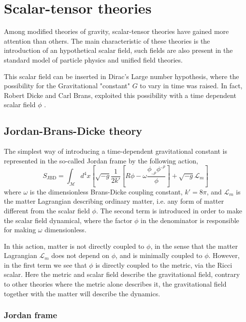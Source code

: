  \chapter{Scalar-tensor theories}

Among modified theories of gravity, scalar-tensor theories have gained more attention than others. 
The main characteristic of these theories is the introduction of an hypothetical scalar field, such fields are also present in the standard model of particle physics and unified field theories.

This scalar field can be inserted in Dirac's Large number hypothesis, where the possibility for the Gravitational "constant" $G$ to vary in time was raised.
In fact, Robert Dicke and Carl Brans, exploited this possibility with a time dependent scalar field $\phi$ \cite{Brans_1961}.

\section{Jordan-Brans-Dicke theory}

The simplest way of introducing a time-dependent gravitational constant is represented in the so-called Jordan frame by the following action,
\begin{equation}
    S_{\text{JBD}}=\int_{\mathcal{M}} d^4x\left[ \sqrt{-g}\frac{1}{2k'}\left[R\phi-\omega \frac{\phi_{,\rho}\phi^{,\rho}}{\phi}\right]+\sqrt{-g}\mathcal{L}_m\right]
    \label{eqn:BD_action_JF}
\end{equation}
where $\omega$ is the dimensionless Brans-Dicke coupling constant, $k'=8\pi$, and $\mathcal{L}_m$ is the matter Lagrangian describing ordinary matter, i.e. any form of matter different from the scalar field $\phi$. The second term is introduced in order to make the scalar field dynamical, where the factor $\phi$ in the denominator is responsible for making $\omega$ dimensionless.

In this action, matter is not directly coupled to $\phi$, in the sense that the matter Lagrangian $\mathcal{L}_m$ does not depend on $\phi$, and is minimally coupled to $\phi$. However, in the first term we see that $\phi$ is directly coupled to the metric, via the Ricci scalar. Here the metric and scalar field describe the gravitational field, contrary to other theories where the metric alone describes it, the gravitational field together with the matter will describe the dynamics. 

\subsection{Jordan frame}

